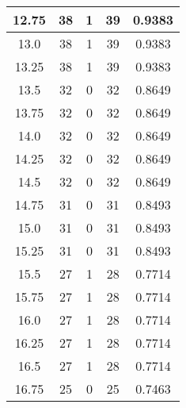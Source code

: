 \documentclass[letterpaper, 12pt]{article}
\begin{document}
\begin{longtable}{|c|c|c|c|c|}
\hline
12.75 & 38 & 1 & 39 & 0.9383 \\
\hline
13.0 & 38 & 1 & 39 & 0.9383 \\
\hline
13.25 & 38 & 1 & 39 & 0.9383 \\
\hline
13.5 & 32 & 0 & 32 & 0.8649 \\
\hline
13.75 & 32 & 0 & 32 & 0.8649 \\
\hline
14.0 & 32 & 0 & 32 & 0.8649 \\
\hline
14.25 & 32 & 0 & 32 & 0.8649 \\
\hline
14.5 & 32 & 0 & 32 & 0.8649 \\
\hline
14.75 & 31 & 0 & 31 & 0.8493 \\
\hline
15.0 & 31 & 0 & 31 & 0.8493 \\
\hline
15.25 & 31 & 0 & 31 & 0.8493 \\
\hline
15.5 & 27 & 1 & 28 & 0.7714 \\
\hline
15.75 & 27 & 1 & 28 & 0.7714 \\
\hline
16.0 & 27 & 1 & 28 & 0.7714 \\
\hline
16.25 & 27 & 1 & 28 & 0.7714 \\
\hline
16.5 & 27 & 1 & 28 & 0.7714 \\
\hline
16.75 & 25 & 0 & 25 & 0.7463 \\
\hline
\end{longtable}
\end{document}
